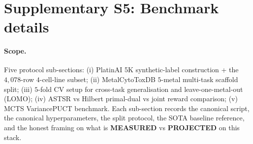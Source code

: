 %

\section*{Supplementary S5: Benchmark details}

\providecommand{\MEASURED}{\textbf{MEASURED}}
\providecommand{\PROJECTED}{\textbf{PROJECTED}}
\providecommand{\DESIGN}{\textbf{DESIGN}}
\providecommand{\CITEDONLY}{\textbf{CITED-ONLY}}

\paragraph{Scope.}
Five protocol sub-sections: (i) PlatinAI 5K synthetic-label
construction + the $4{,}078$-row $4$-cell-line subset; (ii)
MetalCytoToxDB $5$-metal multi-task scaffold split; (iii) $5$-fold
CV setup for cross-task generalisation and leave-one-metal-out
(LOMO); (iv) ASTSR vs Hilbert primal-dual vs joint reward
comparison; (v) MCTS VariancePUCT benchmark.  Each sub-section
records the canonical script, the canonical hyperparameters, the
split protocol, the SOTA baseline reference, and the honest
framing on what is \MEASURED{} vs \PROJECTED{} on this stack.

